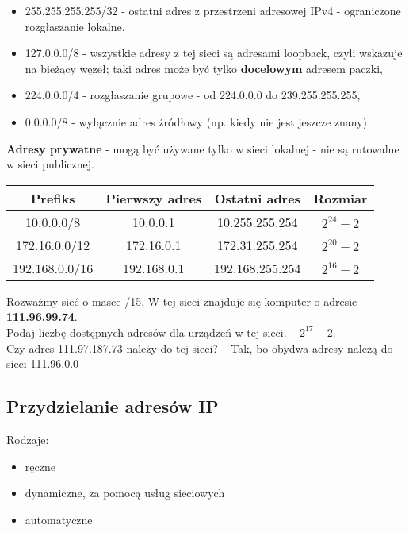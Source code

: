 \begin{itemize}
    \item 255.255.255.255/32 - ostatni adres z przestrzeni adresowej IPv4 - ograniczone rozgłaszanie lokalne, 
    \item 127.0.0.0/8 - wszystkie adresy z tej sieci są adresami loopback, czyli wskazuje na bieżący węzeł; taki adres może być tylko \textbf{docelowym} adresem paczki,
    \item 224.0.0.0/4 - rozgłaszanie grupowe - od 224.0.0.0 do 239.255.255.255,
    \item 0.0.0.0/8 - wyłącznie adres źródłowy (np. kiedy nie jest jeszcze znany)
\end{itemize}

\textbf{Adresy prywatne} - mogą być używane tylko w sieci lokalnej - nie są rutowalne w sieci publicznej. \quad \textbf{}

\begin{center}
    \centering
    \begin{tabular}{|c|c|c|c|}
         \hline
         Prefiks & Pierwszy adres & Ostatni adres & Rozmiar \\
         \hline
         10.0.0.0/8 & 10.0.0.1 & 10.255.255.254 & $2^{24}-2$\\
         \hline
         172.16.0.0/12 & 172.16.0.1 & 172.31.255.254 & $2^{20}-2$ \\
         \hline
         192.168.0.0/16 & 192.168.0.1 & 192.168.255.254 & $2^{16}-2$\\
         \hline
    \end{tabular}
\end{center}

\begin{example}
    Rozważmy sieć o masce /15. W tej sieci znajduje się komputer o adresie \textbf{111.96.99.74}. \\
    Podaj liczbę dostępnych adresów dla urządzeń w tej sieci. -- $2^{17} - 2$.\\
    Czy adres 111.97.187.73 należy do tej sieci? -- Tak, bo obydwa adresy należą do sieci 111.96.0.0
\end{example}

\subsection{Przydzielanie adresów IP}

Rodzaje: 
\begin{itemize}
    \item ręczne
    \item dynamiczne, za pomocą usług sieciowych
    \item automatyczne
\end{itemize}


